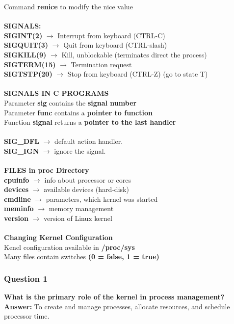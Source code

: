 \documentclass{article}
\begin{document}
Command \textbf{renice} to modify the nice value \\ \\
\textbf{SIGNALS:} \\
\textbf{SIGINT(2)} $\rightarrow$ Interrupt from keyboard (CTRL-C) \\
\textbf{SIGQUIT(3)} $\rightarrow$ Quit from keyboard (CTRL-slash) \\
\textbf{SIGKILL(9)} $\rightarrow$ Kill, unblockable (terminates direct the process) \\
\textbf{SIGTERM(15)} $\rightarrow$ Termination request \\
\textbf{SIGTSTP(20)} $\rightarrow$ Stop from keyboard (CTRL-Z) (go to state T) \\ \\
\textbf{SIGNALS IN C PROGRAMS} \\
Parameter \textbf{sig} contains the \textbf{signal number} \\
Parameter \textbf{func} contains a \textbf{pointer to function} \\
Function \textbf{signal} returns a \textbf{pointer to the last handler} \\ \\
\textbf{SIG\_DFL} $\rightarrow$ default action handler. \\
\textbf{SIG\_IGN} $\rightarrow$ ignore the signal. \\ \\
\textbf{FILES in proc Directory} \\
\textbf{cpuinfo} $\rightarrow$ info about processor or cores \\
\textbf{devices} $\rightarrow$ available devices (hard-disk) \\
\textbf{cmdline} $\rightarrow$ parameters, which kernel was started \\
\textbf{meminfo} $\rightarrow$ memory management \\
\textbf{version} $\rightarrow$ version of Linux kernel \\ \\
\textbf{Changing Kernel Configuration} \\
Kenel configuration available in \textbf{/proc/sys} \\
Many files contain switches \textbf{(0 = false, 1 = true)}


\subsubsection*{Question 1}
\textbf{What is the primary role of the kernel in process management?} \\
\textbf{Answer:} To create and manage processes, allocate resources, and schedule processor time.
\end{document}
